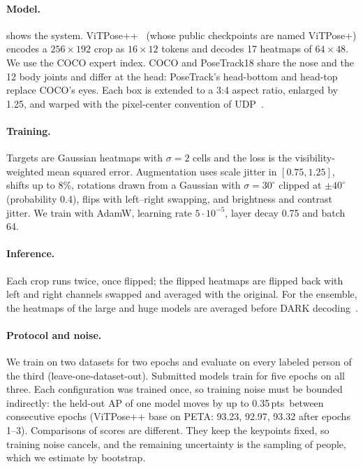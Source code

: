 \documentclass[10pt,twocolumn,letterpaper]{article}
\newcommand{\pts}{\,pts}
\begin{document}
\paragraph{Model.}  shows the system. ViTPose++~\cite{vitposepp} (whose public checkpoints are named ViTPose+) encodes a $256\times192$ crop as $16\times12$ tokens and decodes 17 heatmaps of $64\times48$. We use the COCO expert index. COCO and PoseTrack18 share the nose and the 12 body joints and differ at the head: PoseTrack's head-bottom and head-top replace COCO's eyes. Each box is extended to a 3:4 aspect ratio, enlarged by 1.25, and warped with the pixel-center convention of UDP~\cite{udp}.

\paragraph{Training.} Targets are Gaussian heatmaps with $\sigma=2$ cells and the loss is the visibility-weighted mean squared error. Augmentation uses scale jitter in $[0.75,1.25]$, shifts up to 8\%, rotations drawn from a Gaussian with $\sigma=30^\circ$ clipped at $\pm40^\circ$ (probability 0.4), flips with left--right swapping, and brightness and contrast jitter. We train with AdamW, learning rate $5\cdot10^{-5}$, layer decay 0.75 and batch 64.

\paragraph{Inference.} Each crop runs twice, once flipped; the flipped heatmaps are flipped back with left and right channels swapped and averaged with the original. For the ensemble, the heatmaps of the large and huge models are averaged before DARK decoding~\cite{dark}.

\paragraph{Protocol and noise.} We train on two datasets for two epochs and evaluate on every labeled person of the third (leave-one-dataset-out). Submitted models train for five epochs on all three. Each configuration was trained once, so training noise must be bounded indirectly: the held-out AP of one model moves by up to 0.35\pts\ between consecutive epochs (ViTPose++ base on PETA: 93.23, 92.97, 93.32 after epochs 1--3). Comparisons of scores are different. They keep the keypoints fixed, so training noise cancels, and the remaining uncertainty is the sampling of people, which we estimate by bootstrap.
\end{document}
